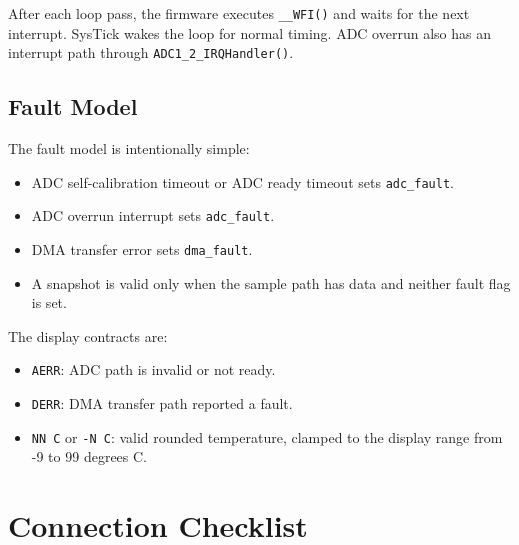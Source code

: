 \documentclass[11pt,a4paper]{article}
\begin{document}
After each loop pass, the firmware executes \texttt{\_\_WFI()} and waits for the
next interrupt. SysTick wakes the loop for normal timing. ADC overrun also has an
interrupt path through \texttt{ADC1\_2\_IRQHandler()}.

\subsection{Fault Model}

The fault model is intentionally simple:

\begin{itemize}[leftmargin=*]
  \item ADC self-calibration timeout or ADC ready timeout sets \texttt{adc\_fault}.
  \item ADC overrun interrupt sets \texttt{adc\_fault}.
  \item DMA transfer error sets \texttt{dma\_fault}.
  \item A snapshot is valid only when the sample path has data and neither fault
        flag is set.
\end{itemize}

The display contracts are:

\begin{itemize}[leftmargin=*]
  \item \texttt{AERR}: ADC path is invalid or not ready.
  \item \texttt{DERR}: DMA transfer path reported a fault.
  \item \texttt{NN C} or \texttt{-N C}: valid rounded temperature, clamped to
        the display range from -9 to 99 degrees C.
\end{itemize}

\section{Connection Checklist}
\end{document}
